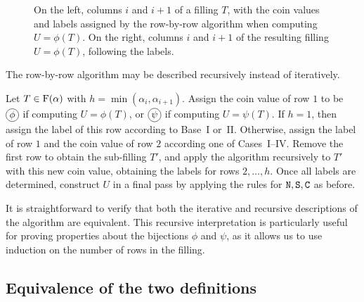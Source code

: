 \begin{figure}[htbp]
    \caption{On the left, columns \(i\) and \(i+1\) of a filling \(T\), with the coin values and labels assigned by the row-by-row algorithm when computing \(U = \phi(T)\). On the right, columns \(i\) and \(i+1\) of the resulting filling \(U = \phi(T)\), following the labels.}
	\label{fig:row-by-row-example}
\end{figure}

The row-by-row algorithm may be described recursively instead of iteratively.

Let \(T \in \Fill(\alpha)\) with \(h = \min(\alpha_i, \alpha_{i+1})\).
Assign the coin value of row \(1\) to be \(\coinphi\) if computing \(U = \phi(T)\), or \(\coinpsi\) if computing \(U = \psi(T)\).
If \(h=1\), then assign the label of this row according to Base~I or~II.
Otherwise, assign the label of row \(1\) and the coin value of row \(2\) according one of Cases~I--IV.
Remove the first row to obtain the sub-filling \(T'\), and apply the algorithm recursively to \(T'\) with this new coin value, obtaining the labels for rows \(2,\dots, h\).
Once all labels are determined, construct \(U\) in a final pass by applying the rules for \(\mathtt{N},\mathtt{S},\mathtt{C}\) as before.

It is straightforward to verify that both the iterative and recursive descriptions of the algorithm are equivalent.
This recursive interpretation is particularly useful for proving properties about the bijections \(\phi\) and \(\psi\), as it allows us to use induction on the number of rows in the filling.

\subsection{Equivalence of the two definitions} \label{subsec:equivalence-of-definitions}

